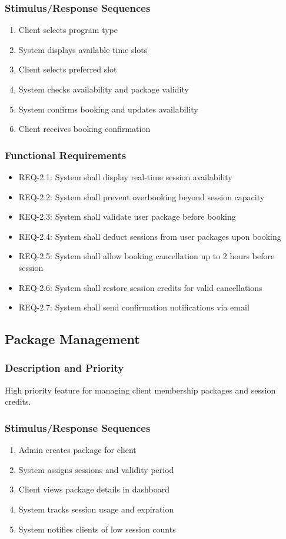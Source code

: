 \documentclass[12pt,a4paper]{article}
\begin{document}
\subsubsection{Stimulus/Response Sequences}
\begin{enumerate}
    \item Client selects program type
    \item System displays available time slots
    \item Client selects preferred slot
    \item System checks availability and package validity
    \item System confirms booking and updates availability
    \item Client receives booking confirmation
\end{enumerate}

\subsubsection{Functional Requirements}
\begin{itemize}
    \item REQ-2.1: System shall display real-time session availability
    \item REQ-2.2: System shall prevent overbooking beyond session capacity
    \item REQ-2.3: System shall validate user package before booking
    \item REQ-2.4: System shall deduct sessions from user packages upon booking
    \item REQ-2.5: System shall allow booking cancellation up to 2 hours before session
    \item REQ-2.6: System shall restore session credits for valid cancellations
    \item REQ-2.7: System shall send confirmation notifications via email
\end{itemize}

\subsection{Package Management}
\subsubsection{Description and Priority}
High priority feature for managing client membership packages and session credits.

\subsubsection{Stimulus/Response Sequences}
\begin{enumerate}
    \item Admin creates package for client
    \item System assigns sessions and validity period
    \item Client views package details in dashboard
    \item System tracks session usage and expiration
    \item System notifies clients of low session counts
\end{enumerate}
\end{document}
